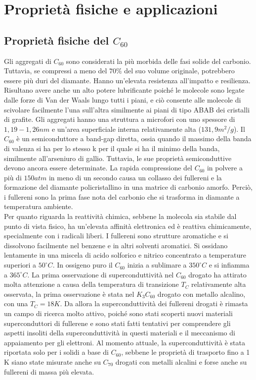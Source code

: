 \documentclass[a4paper,titlepage]{book}
\begin{document}
\section{Proprietà fisiche e applicazioni}
\subsection{Proprietà fisiche del $C_{60}$}
Gli aggregati di $C_ {60}$ sono considerati la più morbida delle fasi solide del carbonio. Tuttavia, se compressi a meno del $70\%$ del suo volume originale, potrebbero essere più duri del diamante. Hanno un'elevata resistenza all'impatto e resilienza. Risultano avere anche un alto potere lubrificante poiché le molecole sono legate dalle forze di Van der Waals lungo tutti i piani, e ciò consente alle molecole di scivolare facilmente l'una sull'altra  similmente ai piani di tipo ABAB dei cristalli di grafite.
Gli aggregati hanno una struttura a microfori con uno spessore di $1,19 - 1,26 nm$ e un'area superficiale interna relativamente alta ($131,9 m^2/g$).
Il $C_{60}$ è un semiconduttore a band-gap diretta, ossia quando il massimo della banda di valenza si ha per lo stesso k per il quale si ha il minimo della banda, similmente all'arseniuro di gallio. Tuttavia, le sue proprietà semiconduttive devono ancora essere determinate. 
La rapida compressione del $C_{60}$ in polvere a più di $150 atm$ in meno di un secondo causa un collasso dei fullereni e la formazione del diamante policristallino in una matrice di carbonio amorfo. Perciò, i fullereni sono la prima fase nota del carbonio che si trasforma in diamante a temperatura ambiente. \\ 
Per quanto riguarda la reattività chimica, sebbene la molecola sia stabile dal punto di vista fisico, ha un'elevata affinità elettronica ed è reattiva chimicamente, specialmente con i radicali liberi. I fullereni sono strutture aromatiche e si dissolvono facilmente nel benzene e in altri solventi aromatici. Si ossidano lentamente in una miscela di acido solforico e nitrico concentrato a temperature superiori a $50^\circ C$. In ossigeno puro il $C_{60}$ inizia a sublimare a $350^\circ C$ e si infiamma a $365^\circ C$.
La prima osservazione di superconduttività nel $C_{60}$ drogato ha attirato molta attenzione a causa della temperatura di transizione $T_C$ relativamente alta osservata, la prima osservazione è stata nel $K_3C_{60}$ drogato con metallo alcalino, con una $T_C=18 K$. Da allora la superconduttività dei fullereni drogati è rimasta un campo di ricerca molto attivo, poiché sono stati scoperti nuovi materiali superconduttori di fullerene e sono stati fatti tentativi per comprendere gli aspetti insoliti della superconduttività in questi materiali e il meccanismo di appaiamento per gli elettroni. Al momento attuale, la superconduttività è stata riportata solo per i solidi a base di $C_{60}$, sebbene le proprietà di trasporto fino a 1 K siano state misurate anche su $C_ {70}$ drogati con metalli alcalini e forse anche su fullereni di massa più elevata.
\end{document}
